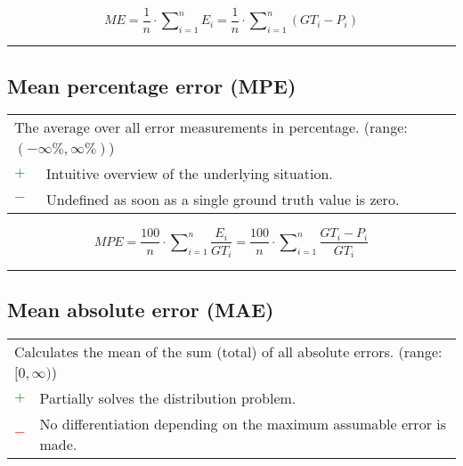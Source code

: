 \documentclass{article}
\begin{document}
\begin{equation}
	\textit{ME} = \dfrac{1}{n} \cdot \sum\nolimits_{i = 1}^n E_i = \dfrac{1}{n} \cdot \sum\nolimits_{i = 1}^n (\textit{GT}_i - P_i)
%
	\label{equation:ME}
\end{equation}

\hrule


\subsection[Mean percentage error (MPE)]{Mean percentage error (MPE) \cite{pearson1895x, jiang2008prediction}}

\begin{table}[H]\centering
	\begin{tabular}{m{}m{}}
		\multicolumn{2}{m{0.95\textwidth}}{The average over all error measurements in percentage. (range: $(-\infty\%, \infty\%)$)} \\
		\textcolor{Green}{$+$} & Intuitive overview of the underlying situation. \\
		\textcolor{Red}{$-$}   & Undefined as soon as a single ground truth value is zero.
	\end{tabular}
\end{table}

\begin{equation}
	\textit{MPE} = \dfrac{100}{n} \cdot \sum\nolimits_{i = 1}^n \dfrac{E_i}{\textit{GT}_i} = \dfrac{100}{n} \cdot \sum\nolimits_{i = 1}^n \dfrac{\textit{GT}_i - P_i}{\textit{GT}_i}
%
	\label{equation:MPE}
\end{equation}

\hrule


\subsection[Mean absolute error (MAE)]{Mean absolute error (MAE) \cite{willmott2005advantages, hyndman2006another}}

\begin{table}[H]\centering
	\begin{tabular}{m{}m{}}
		\multicolumn{2}{m{0.95\textwidth}}{Calculates the mean of the sum (total) of all absolute errors. (range: $[0, \infty)$)} \\
		\textcolor{Green}{$+$} & Partially solves the distribution problem. \\
		\textcolor{Red}{$-$}   & No differentiation depending on the maximum assumable error is made.
	\end{tabular}
\end{table}
\end{document}
